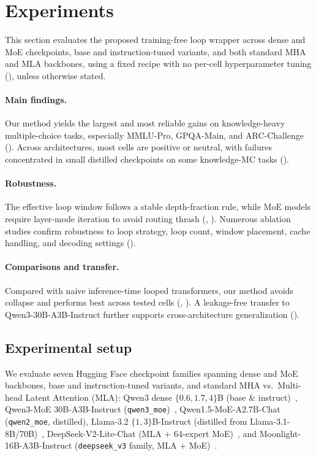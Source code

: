 \section{Experiments}
\label{sec:experiments}

This section evaluates the proposed training-free loop wrapper across dense and MoE checkpoints, base and instruction-tuned variants, and both standard MHA and MLA backbones, using a fixed recipe with no per-cell hyperparameter tuning (), unless otherwise stated.

\paragraph{Main findings.}
Our method yields the largest and most reliable gains on knowledge-heavy multiple-choice tasks, especially MMLU-Pro, GPQA-Main, and ARC-Challenge (). Across architectures, most cells are positive or neutral, with failures concentrated in small distilled checkpoints on some knowledge-MC tasks ().


\paragraph{Robustness.}
The effective loop window follows a stable depth-fraction rule, while MoE models require layer-mode iteration to avoid routing thrash (, ). Numerous ablation studies confirm robustness to loop strategy, loop count, window placement, cache handling, and decoding settings ().

\paragraph{Comparisons and transfer.}
Compared with naive inference-time looped transformers, our method avoids collapse and performs best across tested cells (, ). A leakage-free transfer to Qwen3-30B-A3B-Instruct further supports cross-architecture generalization ().


\subsection{Experimental setup}
\label{sec:setup}

We evaluate seven Hugging Face checkpoint families spanning dense and MoE backbones, base and instruction-tuned variants, and standard MHA vs.\ Multi-head Latent Attention (MLA): Qwen3 dense $\{0.6,1.7,4\}$B (base \& instruct)~\citep{qwen3}, Qwen3-MoE 30B-A3B-Instruct (\texttt{qwen3\_moe})~\citep{qwen3}, Qwen1.5-MoE-A2.7B-Chat (\texttt{qwen2\_moe}, distilled), Llama-3.2 $\{1,3\}$B-Instruct (distilled from Llama-3.1-8B/70B)~\citep{llama3}, DeepSeek-V2-Lite-Chat (MLA + 64-expert MoE)~\citep{deepseekv2}, and Moonlight-16B-A3B-Instruct (\texttt{deepseek\_v3} family, MLA + MoE)~\citep{moonlight}.

